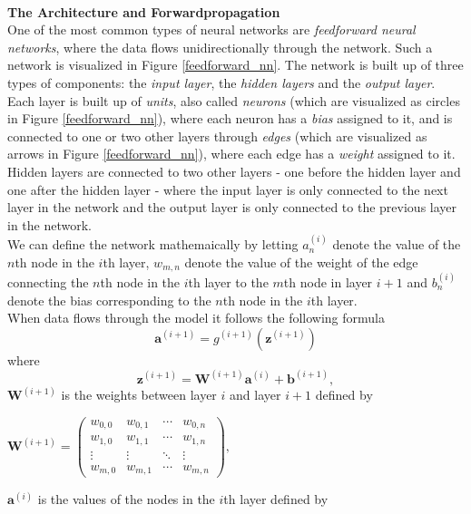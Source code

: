\documentclass[./main.tex]{subfiles}
\begin{document}
\\
\noindent \textbf{The Architecture and Forwardpropagation} \\
One of the most common types of neural networks are \textit{feedforward neural networks}, where the data flows unidirectionally through the network. Such a network is visualized in Figure \ref{feedforward_nn}. The network is built up of three types of components: the \textit{input layer}, the \textit{hidden layers} and the \textit{output layer}. Each layer is built up of \textit{units}, also called \textit{neurons} (which are visualized as circles in Figure \ref{feedforward_nn}), where each neuron has a \textit{bias} assigned to it, and is connected to one or two other layers through \textit{edges} (which are visualized as arrows in Figure \ref{feedforward_nn}), where each edge has a \textit{weight} assigned to it. Hidden layers are connected to two other layers - one before the hidden layer and one after the hidden layer - where the input layer is only connected to the next layer in the network and the output layer is only connected to the previous layer in the network. \\
We can define the network mathemaically by letting $a_n ^{(i)}$ denote the value of the $n$th node in the $i$th layer, $w_{m, n}$ denote the value of the weight of the edge connecting the $n$th node in the $i$th layer to the $m$th node in layer $i + 1$ and $b_n ^{(i)}$ denote the bias corresponding to the $n$th node in the $i$th layer. \\
When data flows through the model it follows the following formula
$$\bm{a}^{(i + 1)} = g^{(i + 1)} \left( \bm{z}^{(i + 1)} \right)$$
where
$$\bm{z}^{(i + 1)} = \bm{W}^{(i + 1)} \bm{a}^{(i)} + \bm{b}^{(i + 1)},$$
$\bm{W}^{(i + 1)}$ is the weights between layer $i$ and layer $i + 1$ defined by
\begin{center}
    \begin{math}
        \bm{W}^{(i + 1)} =
        \begin{pmatrix}
            w_{0, 0} & w_{0, 1} & \cdots & w_{0, n} \\
            w_{1, 0} & w_{1, 1} & \cdots & w_{1, n} \\
            \vdots & \vdots & \ddots & \vdots \\
            w_{m, 0} & w_{m, 1} & \cdots & w_{m, n}
        \end{pmatrix}
        ,
    \end{math}
\end{center}
$\bm{a}^{(i)}$ is the values of the nodes in the $i$th layer defined by
\end{document}
